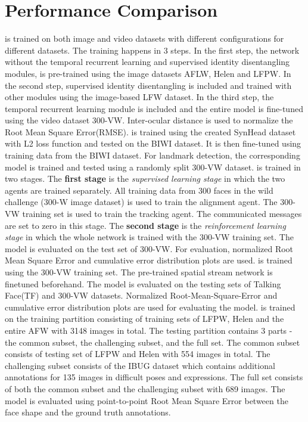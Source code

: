 \documentclass{llncs}
\begin{document}
\section{Performance Comparison}
\cite{rednet} is trained on both image and video datasets with different configurations for different datasets. The training happens in 3 steps. In the first step, the network without the temporal recurrent learning and supervised identity disentangling modules, is pre-trained using the image datasets AFLW, Helen and LFPW. In the second step, supervised identity disentangling is included and trained with other modules using the image-based LFW dataset. In the third step, the temporal recurrent learning module is included and the entire model is fine-tuned using the video dataset 300-VW. Inter-ocular distance is used to normalize the Root Mean Square Error(RMSE). \cite{dynamic_facial_analysis} is trained using the created SynHead dataset with L2 loss function and tested on the BIWI dataset. It is then fine-tuned using training data from the BIWI dataset. For landmark detection, the corresponding model is trained and tested using a randomly split 300-VW dataset. \cite{dadrl} is trained in two stages. The \textbf{first stage} is the \textit{supervised learning stage} in which the two agents are trained separately. All training data from 300 faces in the wild challenge (300-W image dataset) is used to train the alignment agent. The 300-VW training set is used to train the tracking agent. The communicated messages are set to zero in this stage. The \textbf{second stage} is the \textit{reinforcement learning stage} in which the whole network is trained with the 300-VW training set. The model is evaluated on the test set of 300-VW. For evaluation, normalized Root Mean Square Error and cumulative error distribution plots are used. \cite{tstn} is trained using the 300-VW training set. The pre-trained spatial stream network is finetuned beforehand. The model is evaluated on the testing sets of Talking Face(TF) and 300-VW datasets. Normalized Root-Mean-Square-Error and cumulative error distribution plots are used for evaluating the model. \cite{farn} is trained on the training partition consisting of training sets of LFPW, Helen and the entire AFW with 3148 images in total. The testing partition contains 3 parts - the common subset, the challenging subset, and the full set. The common subset consists of testing set of LFPW and Helen with 554 images in total. The challenging subset consists of the IBUG dataset which contains additional annotations for 135 images in difficult poses and expressions. The full set consists of both the common subset and the challenging subset with 689 images. The model is evaluated using point-to-point Root Mean Square Error between the face shape and the ground truth annotations.\\
\end{document}
